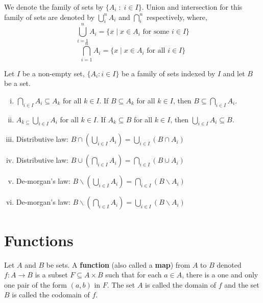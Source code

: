 \documentclass[a4paper,english,12pt]{article}
\begin{document}
We denote the family of sets by $\{A_{i} \;:\; i \in I\}$. Union and intersection for this family of sets are denoted by $\bigcup_{i}^{n}A_{i}$
and $\bigcap_{i}^{n}$ respectively, where,
\begin{equation*}
 \bigcup_{i = 1}^{n}A_{i} = \{x \; | \; x \in A_{i} \text{ for some } i \in I \}
 \nonumber
\end{equation*}
\begin{equation*}
 \bigcap_{i = 1}^{n}A_{i} = \{x \; | \; x \in A_{i} \text{ for all } i \in I \}
 \nonumber
\end{equation*}

\begin{thm}
Let $I$ be a non-empty set, $\{ A_{i} : i \in I \}$ be a family of sets indexed by $I$ and let $B$ be a set.
\begin{enumerate}[i)]
 \item $\displaystyle \bigcap_{i \in I} A_{i}  \subseteq A_{k}$ for all $k \in I$. If $B \subseteq A_{k}$ for all $k \in I$, then $B\displaystyle \subseteq \bigcap_{i \in I}A_{i}$.
 \item $A_{k \subseteq} \displaystyle \bigcup_{i \in I} A_{i}$ for all $k \in I$. If $A_{k} \subseteq B$ for all $k \in I$, then $\displaystyle \bigcup_{i \in I}A_{i} \subseteq B$. \\
 \item Distributive law: $\displaystyle B \cap \left( \bigcup_{i \in I}A_{i} \right) = \bigcup_{i \in I} \left( B \cap A_{i} \right)$
 \item Distributive law: $\displaystyle B \cup \left( \bigcap_{i \in I}A_{i} \right) = \bigcap_{i \in I} \left( B \cup A_{i} \right)$
 \item De-morgan's law: $B \backslash \left( \bigcup_{i \in I}A_{i} \right) = \bigcap_{i \in I} \left( B \backslash A_{i} \right)$
 \item De-morgan's law: $B \backslash \left(\bigcap_{i \in I}A_{i} \right) = \bigcup_{i \in I} \left( B \backslash A_{i} \right)$
 \end{enumerate}
\end{thm}


\section{Functions}

\begin{defn} [Function]
 Let $A$ and $B$ be sets. A \textbf{function} (also called a \textbf{map}) from $A$ to $B$ denoted $f: A \to B$ is a subset $F \subseteq A \times B$ such that for 
 each $a \in A$, there is a one and only one pair of the form $(a,b)$ in $F$. The set $A$ is called the domain of $f$ and the set $B$ is called the 
 codomain of $f$.
\end{defn}
\end{document}
